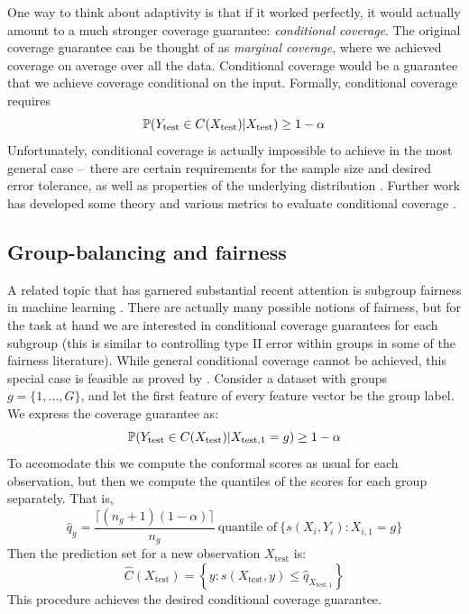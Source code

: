 \documentclass[a4paper, 12pt]{article}
\begin{document}
One way to think about adaptivity is that if it worked perfectly, it would actually amount to a much stronger coverage guarantee: \textit{conditional coverage}. The original coverage guarantee can be thought of as \textit{marginal coverage}, where we achieved coverage on average over all the data. Conditional coverage would be a guarantee that we achieve coverage conditional on the input. Formally, conditional coverage requires
\[ \P(Y_{\text{test}} \in C(X_{\text{test}}) | X_{\text{test}}) \geq 1 - \alpha \]
Unfortunately, conditional coverage is actually impossible to achieve in the most general case --\ there are certain requirements for the sample size and desired error tolerance, as well as properties of the underlying distribution \cite{vovkConditionalValidityInductive2012,barberLimitsDistributionfreeConditional2021}. Further work has developed some theory and various metrics to evaluate conditional coverage \autocite{angelopoulosUncertaintySetsImage2022,cauchoisKnowingWhatYou2021,feldmanImprovingConditionalCoverage2021}.

\subsection{Group-balancing and fairness}
\label{sec:fairness}
A related topic that has garnered substantial recent attention is subgroup fairness in machine learning \autocite{dengFIFAMakingFairness2022,FairnessCriminalJustice,kearnsPreventingFairnessGerrymandering2018}. There are actually many possible notions of fairness, but for the task at hand we are interested in conditional coverage guarantees for each subgroup (this is similar to controlling type II error within groups in some of the fairness literature). While general conditional coverage cannot be achieved, this special case is feasible as proved by \textcite{vovkConditionalValidityInductive2012}. Consider a dataset with groups $g = \{ 1, \ldots, G \}$, and let the first feature of every feature vector be the group label. We express the coverage guarantee as:
\[ \P(Y_{\text{test}} \in C(X_{\text{test}}) | X_{\text{test},1} = g) \geq 1 - \alpha \]
To accomodate this we compute the conformal scores as usual for each observation, but then we compute the quantiles of the scores for each group separately. That is,
\[ \hat{q}_g = \frac{\lceil (n_g+1)(1-\alpha) \rceil }{n_g} ~\text{quantile of}~\{ s(X_i, Y_i) : X_{i,1} = g \} \]
Then the prediction set for a new observation $X_{\text{test}}$ is:
\[ \hat{C}(X_{\text{test}}) = \left\{ y: s(X_{\text{test}}, y) \leq \hat{q}_{X_{\text{test},1}} \right\} \]
This procedure achieves the desired conditional coverage guarantee.
\end{document}
